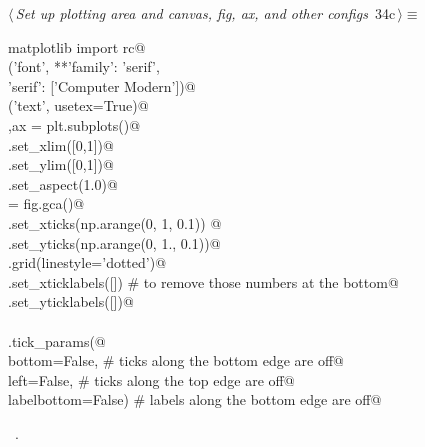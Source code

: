 \documentclass[11.5pt]{report}
\begin{document}
\vspace{-0.8cm}\newchunk 

\begin{flushleft} \small\label{scrap39}\raggedright\small
{} $\langle\,${\itshape Set up plotting area and canvas, fig, ax, and other configs}\nobreak\ {\footnotesize {34c}}$\,\rangle\equiv$
\vspace{-1ex}
\begin{list}{}{} \item
\mbox{}\verb@from matplotlib import rc@\\
\mbox{}\verb@rc('font', **{'family': 'serif', \@\\
\mbox{}\verb@           'serif': ['Computer Modern']})@\\
\mbox{}\verb@rc('text', usetex=True)@\\
\mbox{}\verb@fig,ax = plt.subplots()@\\
\mbox{}\verb@ax.set_xlim([0,1])@\\
\mbox{}\verb@ax.set_ylim([0,1])@\\
\mbox{}\verb@ax.set_aspect(1.0)@\\
\mbox{}\verb@ax = fig.gca()@\\
\mbox{}\verb@ax.set_xticks(np.arange(0, 1, 0.1))     @\\
\mbox{}\verb@ax.set_yticks(np.arange(0, 1., 0.1))@\\
\mbox{}\verb@plt.grid(linestyle='dotted')@\\
\mbox{}\verb@ax.set_xticklabels([]) # to remove those numbers at the bottom@\\
\mbox{}\verb@ax.set_yticklabels([])@\\
\mbox{}\verb@@\\
\mbox{}\verb@ax.tick_params(@\\
\mbox{}\verb@    bottom=False,      # ticks along the bottom edge are off@\\
\mbox{}\verb@    left=False,        # ticks along the top edge are off@\\
\mbox{}\verb@    labelbottom=False) # labels along the bottom edge are off@\\
\mbox{}\verb@@{\NWsep}
\end{list}
\vspace{-1.5ex}
\footnotesize
\begin{list}{}{\setlength{\itemsep}{-\parsep}\setlength{\itemindent}{-\leftmargin}}
\item \NWtxtMacroRefIn\ .

\item{}
\end{list}
\vspace{4ex}
\end{flushleft}
\end{document}
